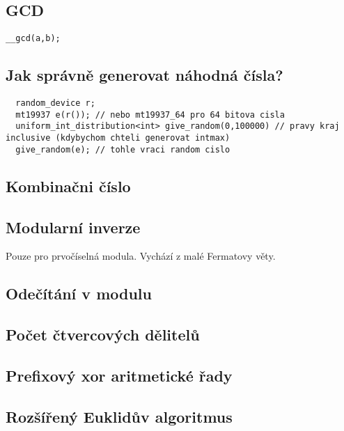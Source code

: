\documentclass[10pt, a4paper]{article}
\begin{document}
\subsection{GCD}
\begin{lstlisting}
__gcd(a,b);
\end{lstlisting}

\subsection{Jak správně generovat náhodná čísla?}
\begin{lstlisting}
  random_device r;
  mt19937 e(r()); // nebo mt19937_64 pro 64 bitova cisla
  uniform_int_distribution<int> give_random(0,100000) // pravy kraj inclusive (kdybychom chteli generovat intmax)
  give_random(e); // tohle vraci random cislo
\end{lstlisting}

\subsection{Kombinačni číslo}


\subsection{Modularní inverze}
Pouze pro prvočíselná modula. Vychází z malé Fermatovy věty.


\subsection{Odečítání v modulu}


\subsection{Počet čtvercových dělitelů}


\subsection{Prefixový xor aritmetické řady}


\subsection{Rozšířený Euklidův algoritmus}

\end{document}
